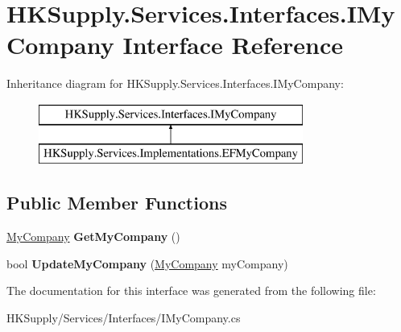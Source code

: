 \hypertarget{interface_h_k_supply_1_1_services_1_1_interfaces_1_1_i_my_company}{}\section{H\+K\+Supply.\+Services.\+Interfaces.\+I\+My\+Company Interface Reference}
\label{interface_h_k_supply_1_1_services_1_1_interfaces_1_1_i_my_company}
Inheritance diagram for H\+K\+Supply.\+Services.\+Interfaces.\+I\+My\+Company\+:\begin{figure}[H]
\begin{center}
\leavevmode
\includegraphics[height=2.000000cm]{interface_h_k_supply_1_1_services_1_1_interfaces_1_1_i_my_company}
\end{center}
\end{figure}
\subsection*{Public Member Functions}
\begin{DoxyCompactItemize}
\item 
\mbox{\label{interface_h_k_supply_1_1_services_1_1_interfaces_1_1_i_my_company_a2771b31985723c012068502824f6a544}} 
\mbox{\hyperlink{class_h_k_supply_1_1_models_1_1_my_company}{My\+Company}} {\bfseries Get\+My\+Company} ()
\item 
\mbox{\label{interface_h_k_supply_1_1_services_1_1_interfaces_1_1_i_my_company_aa69c927f920655aa86dabdd479ab9662}} 
bool {\bfseries Update\+My\+Company} (\mbox{\hyperlink{class_h_k_supply_1_1_models_1_1_my_company}{My\+Company}} my\+Company)
\end{DoxyCompactItemize}


The documentation for this interface was generated from the following file\+:\begin{DoxyCompactItemize}
\item 
H\+K\+Supply/\+Services/\+Interfaces/I\+My\+Company.\+cs\end{DoxyCompactItemize}
